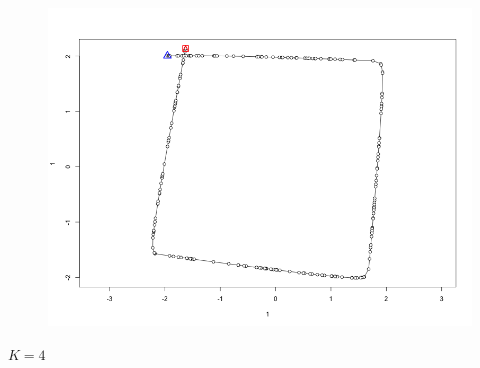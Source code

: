 \begin{figure}[!htb]
\begin{center}
\includegraphics[width=\linewidth/2]{imagenesTrayectorias/lazocerrado/lazocerrado1.png}
\end{center}
\end{figure}
\FloatBarrier


\pagebreak
$K = 4$


